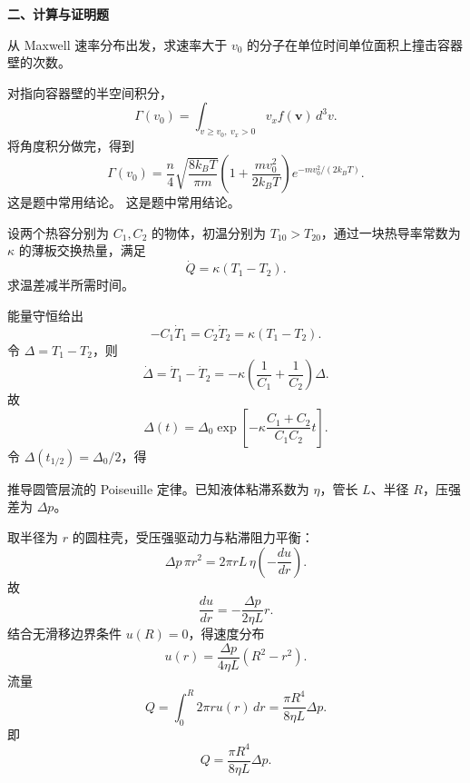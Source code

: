 \textbf{二、计算与证明题}
\begin{question}
从 Maxwell 速率分布出发，求速率大于 $v_0$ 的分子在单位时间单位面积上撞击容器壁的次数。
\begin{solution}

对指向容器壁的半空间积分，
\[
\Gamma(v_0)=\int_{v\ge v_0,\ v_x>0}v_x f(\mathbf v)\,d^3v.
\]
将角度积分做完，得到
\[
\Gamma(v_0)=\frac{n}{4}\sqrt{\frac{8k_BT}{\pi m}}
\left(1+\frac{mv_0^2}{2k_BT}\right)e^{-mv_0^2/(2k_BT)}.
\]
这是题中常用结论。
这是题中常用结论。
\end{solution}
\end{question}


\begin{question}
设两个热容分别为 $C_1,C_2$ 的物体，初温分别为 $T_{10}>T_{20}$，通过一块热导率常数为 $\kappa$ 的薄板交换热量，满足
\[
\dot Q=\kappa(T_1-T_2).
\]
求温差减半所需时间。
\begin{solution}

能量守恒给出
\[
-C_1\dot T_1=C_2\dot T_2=\kappa(T_1-T_2).
\]
令 $\Delta=T_1-T_2$，则
\[
\dot\Delta=\dot T_1-\dot T_2=-\kappa\left(\frac1{C_1}+\frac1{C_2}\right)\Delta.
\]
故
\[
\Delta(t)=\Delta_0\exp\!\left[-\kappa\frac{C_1+C_2}{C_1C_2}t\right].
\]
令 $\Delta(t_{1/2})=\Delta_0/2$，得
\end{solution}
\end{question}

\begin{question}
推导圆管层流的 Poiseuille 定律。已知液体粘滞系数为 $\eta$，管长 $L$、半径 $R$，压强差为 $\Delta p$。
\begin{solution}

取半径为 $r$ 的圆柱壳，受压强驱动力与粘滞阻力平衡：
\[
\Delta p\,\pi r^2=2\pi rL\,\eta\left(-\frac{du}{dr}\right).
\]
故
\[
\frac{du}{dr}=-\frac{\Delta p}{2\eta L}r.
\]
结合无滑移边界条件 $u(R)=0$，得速度分布
\[
 u(r)=\frac{\Delta p}{4\eta L}(R^2-r^2).
\]
流量
\[
Q=\int_0^R2\pi r u(r)\,dr=\frac{\pi R^4}{8\eta L}\Delta p.
\]
即
\[
Q=\frac{\pi R^4}{8\eta L}\Delta p.
\]
\end{solution}
\end{question}

